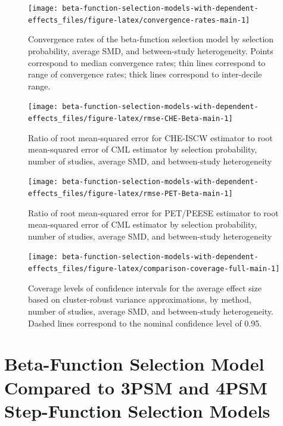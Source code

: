 \documentclass[
  american,
  man, donotrepeattitle,floatsintext]{apa7}
\begin{document}
\begin{figure}
\texttt{[image: beta-function-selection-models-with-dependent-effects\_files/figure-latex/convergence-rates-main-1]} \caption{Convergence rates of the beta-function selection model by selection probability, average SMD, and between-study heterogeneity. Points correspond to median convergence rates; thin lines correspond to range of convergence rates; thick lines correspond to inter-decile range.}\label{fig:convergence-rates-main}
\end{figure}

\begin{figure}
\texttt{[image: beta-function-selection-models-with-dependent-effects\_files/figure-latex/rmse-CHE-Beta-main-1]} \caption{Ratio of root mean-squared error for CHE-ISCW estimator to root mean-squared error of CML estimator by selection probability, number of studies, average SMD, and between-study heterogeneity}\label{fig:rmse-CHE-Beta-main}
\end{figure}

\begin{figure}
\texttt{[image: beta-function-selection-models-with-dependent-effects\_files/figure-latex/rmse-PET-Beta-main-1]} \caption{Ratio of root mean-squared error for PET/PEESE estimator to root mean-squared error of CML estimator by selection probability, number of studies, average SMD, and between-study heterogeneity}\label{fig:rmse-PET-Beta-main}
\end{figure}

\begin{figure}
\texttt{[image: beta-function-selection-models-with-dependent-effects\_files/figure-latex/comparison-coverage-full-main-1]} \caption{Coverage levels of confidence intervals for the average effect size based on cluster-robust variance approximations, by method, number of studies, average SMD, and between-study heterogeneity. Dashed lines correspond to the nominal confidence level of 0.95.}\label{fig:comparison-coverage-full-main}
\end{figure}

\section{Beta-Function Selection Model Compared to 3PSM and 4PSM Step-Function Selection Models}\label{beta-function-selection-model-compared-to-3psm-and-4psm-step-function-selection-models-1}
\end{document}
